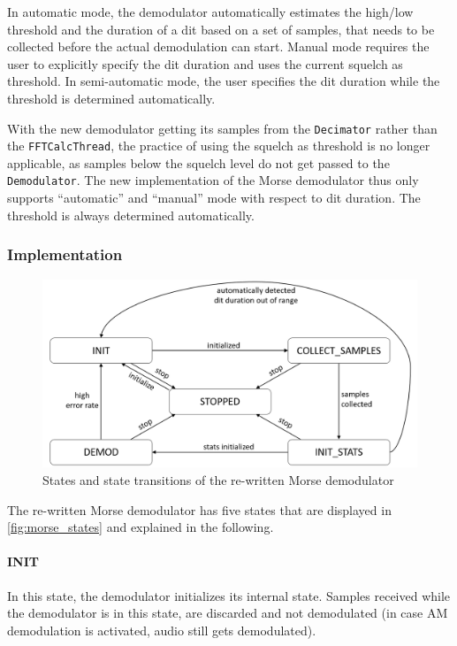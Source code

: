 In automatic mode, the demodulator automatically estimates the high/low threshold and the duration of a dit based on a set of samples, that needs to be collected before the actual demodulation can start. Manual mode requires the user to explicitly specify the dit duration and uses the current squelch as threshold. In semi-automatic mode, the user specifies the dit duration while the threshold is determined automatically.

With the new demodulator getting its samples from the \texttt{Decimator} rather than the \texttt{FFTCalcThread}, the practice of using the squelch as threshold is no longer applicable, as samples below the squelch level do not get passed to the \texttt{Demodulator}. The new implementation of the Morse demodulator thus only supports ``automatic'' and ``manual'' mode with respect to dit duration. The threshold is always determined automatically.


\subsubsection{Implementation}

\begin{figure}
	\centering
	\includegraphics[width=1\linewidth]{gfx/morse_states.png}
	\caption{States and state transitions of the re-written Morse demodulator}
	\label{fig:morse_states}
\end{figure}

The re-written Morse demodulator has five states that are displayed in \autoref{fig:morse_states} and explained in the following.

\paragraph{INIT} In this state, the demodulator initializes its internal state. Samples received while the demodulator is in this state, are discarded and not demodulated (in case \ac{AM} demodulation is activated, audio still gets demodulated).
